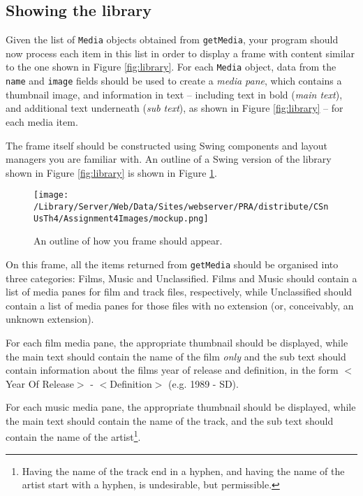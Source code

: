 \documentclass[11pt]{article}
\begin{document}
\subsection{Showing the library}

Given the list of \texttt{Media} objects obtained from \texttt{getMedia}, your program should now process each item in this list in order to display a frame with content similar to the one shown in Figure \ref{fig:library}. For each \texttt{Media} object, data from the \texttt{name} and \texttt{image} fields should be used to create a \emph{media pane}, which contains a thumbnail image, and information in text -- including text in bold (\emph{main text}), and additional text underneath (\emph{sub text}), as shown in Figure \ref{fig:library} -- for each media item.

The frame itself should be constructed using Swing components and layout managers you are familiar with. An outline of a Swing version of the library shown in Figure \ref{fig:library} is shown in Figure \ref{fig:mockup}.

\begin{figure}[htbp]
\begin{center}
\texttt{[image: /Library/Server/Web/Data/Sites/webserver/PRA/distribute/CSnUsTh4/Assignment4Images/mockup.png]}
\caption{An outline of how you frame should appear.}
\label{fig:mockup}
\end{center}
\end{figure}

On this frame, all the items returned from \texttt{getMedia} should be organised into three categories: Films, Music and Unclassified. Films and Music should contain a list of media panes for film and track files, respectively, while Unclassified should contain a list of media panes for those files with no extension (or, conceivably, an unknown extension).

For each film media pane, the appropriate thumbnail should be displayed, while the main text should contain the name of the film \emph{only} and the sub text should contain information about the films year of release and definition, in the form $<$Year Of Release$>$ - $<$Definition$>$ (e.g. 1989 - SD).

For each music media pane, the appropriate thumbnail should be displayed, while the main text should contain the name of the track, and the sub text should contain the name of the artist\footnote{Having the name of the track end in a hyphen, and having the name of the artist start with a hyphen, is undesirable, but permissible.}.
\end{document}
